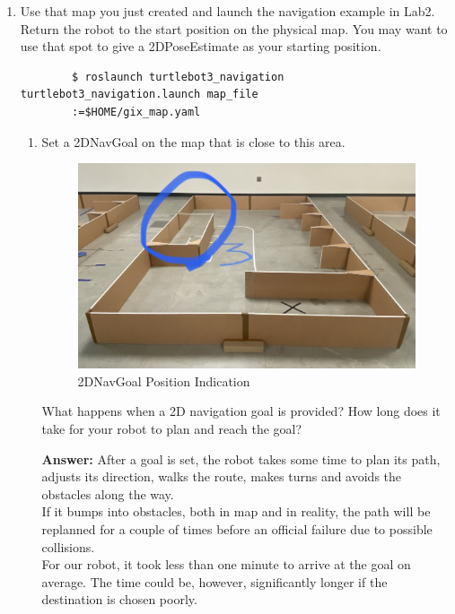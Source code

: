 \documentclass[12pt]{article}
\begin{document}
\begin{enumerate}
    \item Use that map you just created and launch the navigation example in Lab2. Return the robot to the start position on the physical map. You may want to use that spot to give a 2DPoseEstimate as your starting position.
    \begin{verbatim}
        $ roslaunch turtlebot3_navigation turtlebot3_navigation.launch map_file
        :=$HOME/gix_map.yaml
    \end{verbatim}
    \begin{enumerate}

        \item Set a 2DNavGoal on the map that is close to this area.
        
        \begin{figure}[H]
        \centering\includegraphics[width=14cm]{images/map2.jpeg}
        \caption{2DNavGoal Position Indication}
        \end{figure}
        
        What happens when a 2D navigation goal is provided? How long does it take for your robot to plan and reach the goal?

        \textbf{Answer: }After a goal is set, the robot takes some time to plan its path, adjusts its direction, walks the route, makes turns and avoids the obstacles along the way.
        \\If it bumps into obstacles, both in map and in reality, the path will be replanned for a couple of times before an official failure due to possible collisions.
        \\For our robot, it took less than one minute to arrive at the goal on average. The time could be, however, significantly longer if the destination is chosen poorly.


\end{enumerate}
\end{enumerate}
\end{document}
